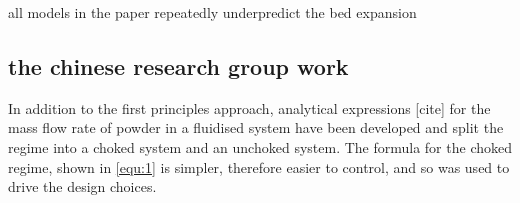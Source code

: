 all models in the paper repeatedly underpredict the bed expansion
\subsection{the chinese research group work}

In addition to the first principles approach, analytical expressions [cite] for the mass flow rate of powder in a fluidised system have been developed and split the regime into a choked system and an unchoked system. The formula for the choked regime, shown in \autoref{equ:1} is simpler, therefore easier to control, and so was used to drive the design choices.

    
